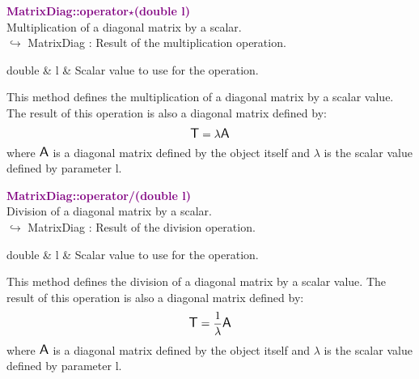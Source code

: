 \textcolor{purple}{\textbf{MatrixDiag::operator$\star$(double l)}}\label{MatrixDiag::operator*(double l)}\\
Multiplication of a diagonal matrix by a scalar.\\ \hspace*{10mm}$\hookrightarrow$ MatrixDiag : Result of the multiplication operation.

\begin{tcolorbox}[width=\textwidth,myArgs,tabularx={ll|R}]
double & l & Scalar value to use for the operation.
\end{tcolorbox}

This method defines the multiplication of a diagonal matrix by a scalar value.
The result of this operation is also a diagonal matrix defined by:
\begin{equation*}
\mbox{\large\ensuremath{\mathsf{T}}} = \lambda \mbox{\large\ensuremath{\mathsf{A}}}
\end{equation*}
where $\mbox{\large\ensuremath{\mathsf{A}}}$ is a diagonal matrix defined by the object itself and $\lambda$ is the scalar value defined by parameter l.

\textcolor{purple}{\textbf{MatrixDiag::operator/(double l)}}\label{MatrixDiag::operator/(double l)}\\
Division of a diagonal matrix by a scalar.\\ \hspace*{10mm}$\hookrightarrow$ MatrixDiag : Result of the division operation.

\begin{tcolorbox}[width=\textwidth,myArgs,tabularx={ll|R}]
double & l & Scalar value to use for the operation.
\end{tcolorbox}

This method defines the division of a diagonal matrix by a scalar value.
The result of this operation is also a diagonal matrix defined by:
\begin{equation*}
\mbox{\large\ensuremath{\mathsf{T}}} = \frac{1}{\lambda} \mbox{\large\ensuremath{\mathsf{A}}}
\end{equation*}
where $\mbox{\large\ensuremath{\mathsf{A}}}$ is a diagonal matrix defined by the object itself and $\lambda$ is the scalar value defined by parameter l.

